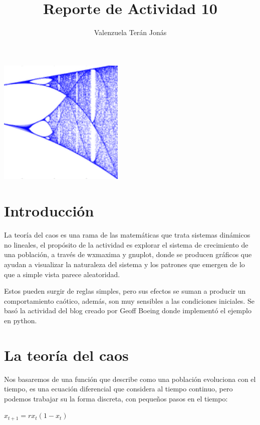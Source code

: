 \documentclass[a4paper]{article}
\title{Reporte de Actividad 10}
\author{Valenzuela Terán Jonás}
\begin{document}
\maketitle


\begin{center}

	\includegraphics[height=6cm]{logistic-bifurcation.png}

\end{center}

\section{Introducción}

La teoría del caos es una rama de las matemáticas que trata sistemas dinámicos no lineales, el propósito de la actividad es explorar el sistema de crecimiento de una población, a través de wxmaxima y gnuplot, donde se producen gráficos que ayudan a visualizar la naturaleza del sistema y los patrones que emergen de lo que a simple vista parece aleatoridad.

Estos pueden surgir de reglas simples, pero sus efectos se suman a producir un comportamiento caótico, además, son muy sensibles a las condiciones iniciales. Se basó la actividad del blog creado por Geoff Boeing donde implementó el ejemplo en python.

\section{La teoría del caos}

Nos basaremos de una función que describe como una población evoluciona con el tiempo, es una ecuación diferencial que considera al tiempo continuo, pero podemos trabajar su la forma discreta, con pequeños pasos en el tiempo:

\begin{center}
$x_{t+1}=rx_t (1- x_t)$
\end{center}
\end{document}

